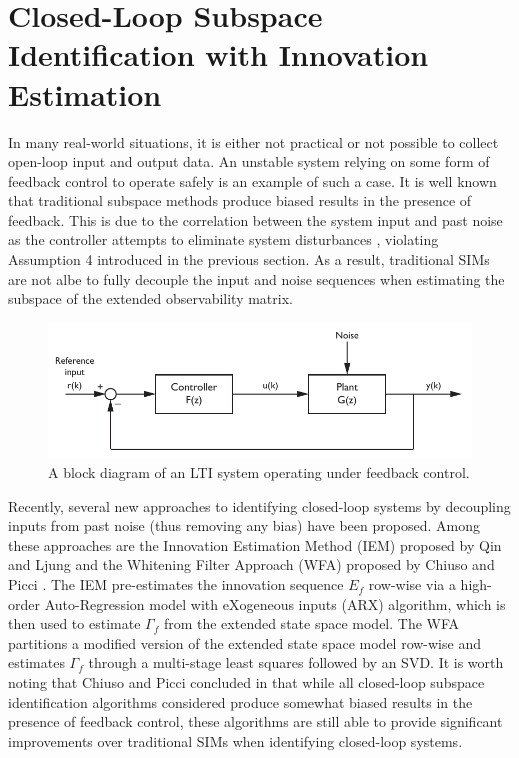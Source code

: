 \section{Closed-Loop Subspace Identification with Innovation Estimation}\label{sec:closed-loop_subspace_identification}
In many real-world situations, it is either not practical or not possible to collect open-loop input and output data. An unstable system relying on some form of feedback control to operate safely is an example of such a case. It is well known that traditional subspace methods produce biased results in the presence of feedback. This is due to the correlation between the system input and past noise as the controller attempts to eliminate system disturbances \cite{qin2006overview}, violating Assumption 4 introduced in the previous section. As a result, traditional SIMs are not albe to fully decouple the input and noise sequences when estimating the subspace of the extended observability matrix.
\begin{figure}[htb!]
	\centering
	\includegraphics{../fig/closed_loop_block_diagram.pdf}
	\caption{A block diagram of an LTI system operating under feedback control.}
\end{figure}

Recently, several new approaches to identifying closed-loop systems by decoupling inputs from past noise (thus removing any bias) have been proposed. Among these approaches are the Innovation Estimation Method (IEM) proposed by Qin and Ljung \cite{qin2003closed} and the Whitening Filter Approach (WFA) proposed by Chiuso and Picci \cite{chiuso2005consistency}. The IEM pre-estimates the innovation sequence $E_f$ row-wise via a high-order Auto-Regression model with eXogeneous inputs (ARX) algorithm, which is then used to estimate $\Gamma_f$ from the extended state space model. The WFA partitions a modified version of the extended state space model row-wise and estimates $\Gamma_f$ through a multi-stage least squares followed by an SVD. It is worth noting that Chiuso and Picci concluded in \cite{chiuso2005consistency} that while all closed-loop subspace identification algorithms considered produce somewhat biased results in the presence of feedback control, these algorithms are still able to provide significant improvements over traditional SIMs when identifying closed-loop systems.

